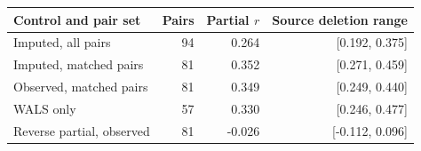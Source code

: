 \begin{tabular}{lrrr}
\toprule
Control and pair set & Pairs & Partial $r$ & Source deletion range \\
\midrule
Imputed, all pairs & 94 & 0.264 & [0.192, 0.375] \\
Imputed, matched pairs & 81 & 0.352 & [0.271, 0.459] \\
Observed, matched pairs & 81 & 0.349 & [0.249, 0.440] \\
WALS only & 57 & 0.330 & [0.246, 0.477] \\
Reverse partial, observed & 81 & -0.026 & [-0.112, 0.096] \\
\bottomrule
\end{tabular}
